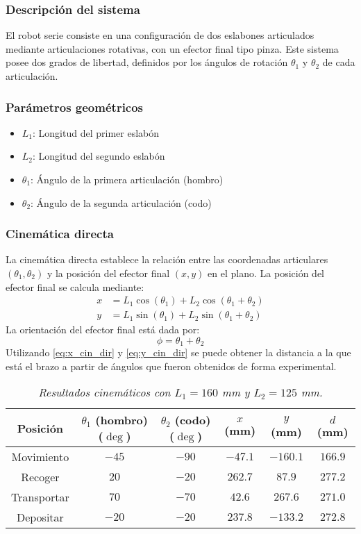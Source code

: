 \subsubsection{Descripción del sistema}
\label{sec:desc_brazo}

El robot serie consiste en una configuración de dos eslabones articulados mediante articulaciones rotativas, con un efector final tipo pinza. Este sistema posee dos grados de libertad, definidos por los ángulos de rotación $\theta_1$ y $\theta_2$ de cada articulación.

\subsubsection{Parámetros geométricos}
\label{sec:Param_brazo}
\begin{itemize}[label=$\bullet$]
    \item $L_1$: Longitud del primer eslabón
    \item $L_2$: Longitud del segundo eslabón
    \item $\theta_1$: Ángulo de la primera articulación (hombro)
    \item $\theta_2$: Ángulo de la segunda articulación (codo)
\end{itemize}

\subsubsection{Cinemática directa}
La cinemática directa establece la relación entre las coordenadas articulares $(\theta_1, \theta_2)$ y la posición del efector final $(x, y)$ en el plano.
La posición del efector final se calcula mediante:
\begin{align}
x &= L_1 \cos(\theta_1) + L_2 \cos(\theta_1 + \theta_2) \label{eq:x_cin_dir}\\
y &= L_1 \sin(\theta_1) + L_2 \sin(\theta_1 + \theta_2) \label{eq:y_cin_dir}
\end{align}
La orientación del efector final está dada por:
\begin{equation}
\phi = \theta_1 + \theta_2
\end{equation}
Utilizando \ref{eq:x_cin_dir} y \ref{eq:y_cin_dir} se puede obtener la distancia a la que está el brazo a partir de ángulos que fueron obtenidos de forma experimental.
\begin{table}[h]
\centering
\begin{tabular}{|c|c|c|c|c|c|}
\hline
Posición & $\theta_1$ (hombro) ($\deg$) & $\theta_2$ (codo) ($\deg$) & $x$ (mm) & $y$ (mm) & $d$ (mm) \\
\hline
Movimiento & $-45$ & $-90$ & $-47.1$ & $-160.1$ & $166.9$ \\
\hline
Recoger & $20$ & $-20$ & $262.7$ & $87.9$ & $277.2$ \\
\hline
Transportar & $70$ & $-70$ & $42.6$ & $267.6$ & $271.0$ \\
\hline
Depositar & $-20$ & $-20$ & $237.8$ & $-133.2$ & $272.8$ \\
\hline
\end{tabular}
\caption{\textit{Resultados cinemáticos con $L_1 = 160$ mm y $L_2 = 125$ mm.}}
\end{table}


